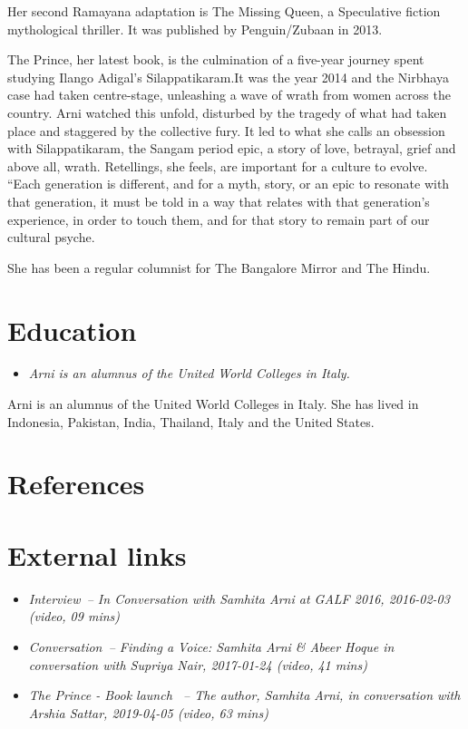 Her second Ramayana adaptation is The Missing Queen, a Speculative
fiction mythological thriller. It was published by Penguin/Zubaan in
2013.

The Prince, her latest book, is the culmination of a five-year journey
spent studying Ilango Adigal's Silappatikaram.It was the year 2014 and
the Nirbhaya case had taken centre-stage, unleashing a wave of wrath
from women across the country. Arni watched this unfold, disturbed by
the tragedy of what had taken place and staggered by the collective
fury. It led to what she calls an obsession with Silappatikaram, the
Sangam period epic, a story of love, betrayal, grief and above all,
wrath. Retellings, she feels, are important for a culture to evolve.
``Each generation is different, and for a myth, story, or an epic to
resonate with that generation, it must be told in a way that relates
with that generation's experience, in order to touch them, and for that
story to remain part of our cultural psyche.

She has been a regular columnist for The Bangalore Mirror and The Hindu.

\section{Education}\label{education}

\begin{itemize}
\item
  \emph{Arni is an alumnus of the United World Colleges in Italy.}
\end{itemize}

Arni is an alumnus of the United World Colleges in Italy. She has lived
in Indonesia, Pakistan, India, Thailand, Italy and the United States.

\section{References}\label{references}

\section{External links}\label{external-links}

\begin{itemize}
\item
  \emph{Interview~-- In Conversation with Samhita Arni at GALF 2016,
  2016-02-03 (video, 09 mins)}
\item
  \emph{Conversation~-- Finding a Voice: Samhita Arni \& Abeer Hoque in
  conversation with Supriya Nair, 2017-01-24 (video, 41 mins)}
\item
  \emph{The Prince - Book launch ~-- The author, Samhita Arni, in
  conversation with Arshia Sattar, 2019-04-05 (video, 63 mins)}
\end{itemize}


